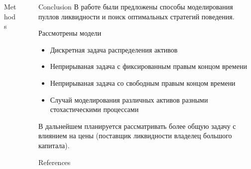 \documentclass[]{beamer}
\begin{document}
\begin{frame}[t]
\begin{columns}[t]
\begin{column}{\twocolwid}
\begin{columns}[t,totalwidth=\twocolwid]
\begin{column}{\onecolwid}
\begin{block}{Methods}
        \end{block}
    
    \end{column} %
    
    \end{columns} %
    
    \end{column} %
    
    \begin{column}{\sepwid}\end{column} %
    
    \begin{column}{\onecolwid} %
    
    
    \begin{block}{Conclusion}
    В работе были предложены способы моделирования пуллов ликвидности и поиск оптимальных стратегий поведения.

    Рассмотрены модели 
    \begin{itemize}
    \item Дискретная задача распределения активов
    \item Неприрываная задача с фиксированным правым концом времени
    \item Неприрываная задача со свободным правым концом времени
    \item Случай моделирования различных активов разными стохастическими процессами
    \end{itemize}
    
    В дальнейшем планируется рассматривать более общую задачу с влиянием на цены (поставщик ликвидности владелец большого капитала).
    \end{block}
    
    
    \begin{block}{References}
    
    \printbibliography \vspace{0.75in}
    

\end{block}
\end{column}
\end{columns}
\end{frame}
\end{document}
